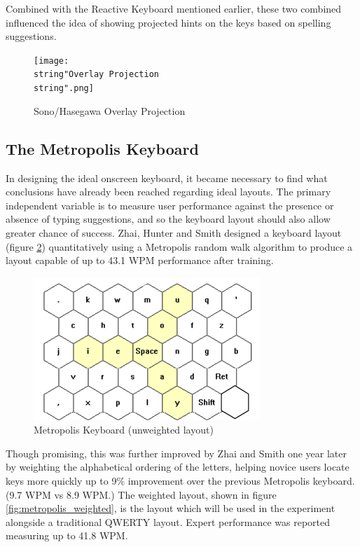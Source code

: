 \documentclass[english]{vgtc}
\begin{document}
Combined with the Reactive Keyboard mentioned earlier, these two combined influenced the idea of showing projected hints on the keys based on spelling suggestions.

\begin{figure}[!htb]
  \centering
  \texttt{[image: \\string"Overlay Projection\\string".png]}
  \caption{Sono/Hasegawa Overlay Projection \cite{Sono19}}
  \label{fig:overlay}
\end{figure}

\subsection{The Metropolis Keyboard}
In designing the ideal onscreen keyboard, it became necessary to find
what conclusions have already been reached regarding ideal layouts.
The primary independent variable is to measure user performance against
the presence or absence of typing suggestions, and so the keyboard
layout should also allow greater chance of success. Zhai, Hunter and
Smith designed a keyboard layout (figure \ref{fig:metropolis}) quantitatively using a
Metropolis random walk algorithm to produce a layout capable of up to 43.1
WPM performance after training. \cite{Zhai00}

\begin{figure}[!htb]
  \centering
  \includegraphics[width=0.95\columnwidth]{Metropolis}
  \caption{Metropolis Keyboard (unweighted layout) \cite{Zhai00}}
  \label{fig:metropolis}
\end{figure}

Though promising, this was further improved by Zhai and Smith one
year later \cite{Zhai01} by weighting the alphabetical ordering of
the letters, helping novice users locate keys more quickly up to
9\% improvement over the previous Metropolis keyboard. (9.7 WPM vs 8.9 WPM.) The weighted layout, shown in figure \ref{fig:metropolis_weighted}, is the layout which will be used in the experiment alongside a traditional QWERTY layout.  Expert performance was reported measuring up to 41.8 WPM.
\end{document}
